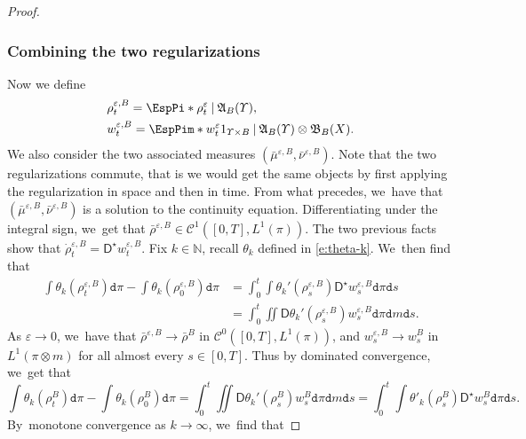 \documentclass[JEP,XML,SOM,Unicode,published]{cedram}
\theoremstyle{definition}
\theoremstyle{remark}
\newcommand{\given}[1][]{%
\nonscript\:#1\vert
\allowbreak
\nonscript\:
\mathopen{}}
\begin{document}
\begin{proof}
\subsubsection*{Combining the two regularizations}
Now we define
\begin{align*}
& \rho^{\varepsilon,B}_{t} = \EspPi*{ \rho^{\varepsilon}_{t} \given \mathfrak{A}_{B}(\varUpsilon) }, \\
& w^{\varepsilon,B}_{t} = \EspPim*{ w^{\varepsilon}_{t} 1_{\varUpsilon \times B} \given \mathfrak{A}_{B}(\varUpsilon) \otimes \mathfrak{B}_{B}(X) }.
\end{align*}
We also consider the two associated measures $(\bar{\mu}^{\varepsilon, B}, \bar{\nu}^{\varepsilon,B})$.
Note that the two regularizations commute, that is we would get the same objects by first applying the regularization in space and then in time.
From what precedes, we~have that $(\bar{\mu}^{\varepsilon, B}, \bar{\nu}^{\varepsilon,B})$ is a solution to the continuity equation.
Differentiating under the integral sign, we~get that $\bar{\rho}^{\varepsilon, B} \in \mathscr{C}^{1}([0,T], L^{1}(\pi))$.
The two previous facts show that $\dot{\rho}^{\varepsilon,B}_{t} = \mathsf{D}^{\star} w_{t}^{\varepsilon,B}$.
Fix $k \in \mathbb{N}$, recall $\theta_{k}$ defined in \cref{e:theta-k}. We~then find that
\begin{align*}
\int \theta_{k}(\rho^{\varepsilon,B}_{t}) \mathtt{d} \pi - \int \theta_{k}(\rho^{\varepsilon,B}_{0}) \mathtt{d} \pi &= \int_{0}^{t} \int \theta_{k}'(\rho_{s}^{\varepsilon,B}) \mathsf{D}^{\star} w_{s}^{\varepsilon, B} \mathtt{d} \pi \mathtt{d} s \\
&= \int_{0}^{t} \iint \mathsf{D} \theta_{k}'(\rho_{s}^{\varepsilon,B}) w_{s}^{\varepsilon, B} \mathtt{d} \pi \mathtt{d} m \mathtt{d} s.
\end{align*}
As $\varepsilon \to 0$, we~have that $\bar{\rho}^{\varepsilon,B} \to \bar{\rho}^{B}$ in $\mathscr{C}^{0}([0,T], L^{1}(\pi))$, and $w_{s}^{\varepsilon,B} \to w_{s}^{B}$ in $L^{1}(\pi \otimes m)$ for all almost every $s \in [0,T]$.
Thus by dominated convergence, we~get that
\begin{equation*}
\int \theta_{k}(\rho^{B}_{t}) \mathtt{d} \pi - \int \theta_{k}(\rho^{B}_{0}) \mathtt{d} \pi = \int_{0}^{t} \iint \mathsf{D} \theta_{k}'(\rho_{s}^{B}) w_{s}^{B} \mathtt{d} \pi \mathtt{d} m \mathtt{d} s = \int_{0}^{t} \int \theta'_{k}(\rho^{B}_{s}) \mathsf{D}^{\star} w^{B}_{s} \mathtt{d} \pi \mathtt{d} s.
\end{equation*}
By~monotone convergence as $k \to \infty$, we~find that

\end{proof}
\end{document}
